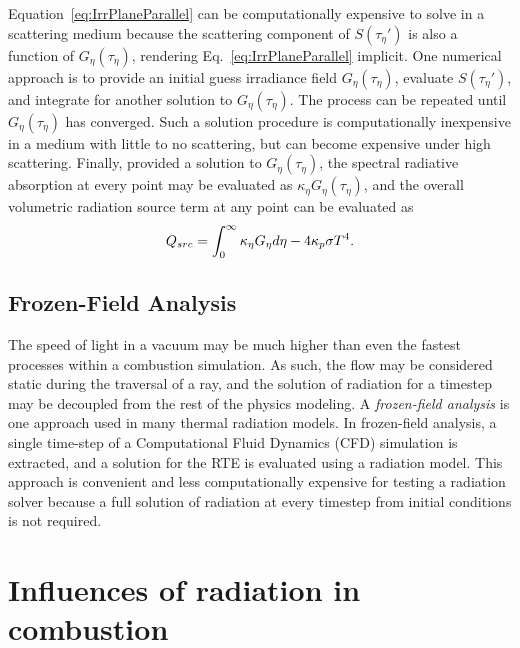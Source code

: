 Equation~\ref{eq:IrrPlaneParallel} can be computationally expensive to solve in a scattering medium because the scattering component of $S(\tau{}_\eta')$ is also a function of $G_\eta(\tau_\eta)$, rendering Eq.~\ref{eq:IrrPlaneParallel} implicit. One numerical approach is to provide an initial guess irradiance field $G_\eta(\tau_\eta)$, evaluate $S(\tau{}_\eta')$, and integrate for another solution to $G_\eta(\tau_\eta)$. The process can be repeated until $G_\eta(\tau_\eta)$ has converged. Such a solution procedure is computationally inexpensive in a medium with little to no scattering, but can become expensive under high scattering.
Finally, provided a solution to $G_\eta{}(\tau_\eta)$, the spectral radiative absorption at every point may be evaluated as $\kappa{}_\eta{}G_\eta{}(\tau_\eta)$, and the overall volumetric radiation source term at any point can be evaluated as 
\begin{equation}
    \centering
    Q_{src}=\int_0^\infty{}\kappa{}_\eta{}G_\eta{}d\eta{}-4\kappa_p\sigma{}T^4 .
    \label{eq:RadSrcPP}
\end{equation}


\subsection{Frozen-Field Analysis}
The speed of light in a vacuum may be much higher than even the fastest processes within a combustion simulation. As such, the flow may be considered static during the traversal of a ray, and the solution of radiation for a timestep may be decoupled from the rest of the physics modeling.
A \textit{frozen-field analysis} is one approach used in many thermal radiation models. In frozen-field analysis, a single time-step of a Computational Fluid Dynamics (CFD) simulation is extracted, and a solution for the RTE is evaluated using a radiation model. 
This approach is convenient and less computationally expensive for testing a radiation solver because a full solution of radiation at every timestep from initial conditions is not required.

\section{Influences of radiation in combustion}


